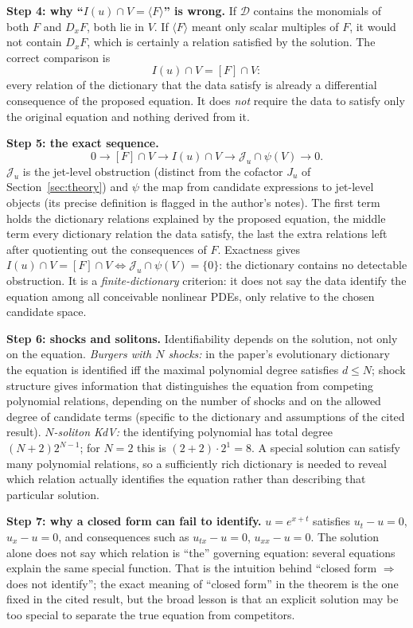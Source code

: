 \medskip\textbf{Step 4: why ``$I(u)\cap V=\langle F\rangle$'' is wrong.} If $\mathcal D$ contains the monomials of both $F$ and $D_xF$, both lie in $V$. If $\langle F\rangle$ meant only scalar multiples of $F$, it would not contain $D_xF$, which is certainly a relation satisfied by the solution. The correct comparison is
\[
I(u)\cap V=[F]\cap V:
\]
every relation of the dictionary that the data satisfy is already a differential consequence of the proposed equation. It does \emph{not} require the data to satisfy only the original equation and nothing derived from it.

\medskip\textbf{Step 5: the exact sequence.}
\[
0\to[F]\cap V\to I(u)\cap V\to\mathcal J_u\cap\psi(V)\to0 .
\]
$\mathcal J_u$ is the jet-level obstruction (distinct from the cofactor $J_u$ of Section~\ref{sec:theory}) and $\psi$ the map from candidate expressions to jet-level objects (its precise definition is flagged in the author's notes). The first term holds the dictionary relations explained by the proposed equation, the middle term every dictionary relation the data satisfy, the last the extra relations left after quotienting out the consequences of $F$. Exactness gives $I(u)\cap V=[F]\cap V\iff\mathcal J_u\cap\psi(V)=\{0\}$: the dictionary contains no detectable obstruction. It is a \emph{finite-dictionary} criterion: it does not say the data identify the equation among all conceivable nonlinear PDEs, only relative to the chosen candidate space.

\medskip\textbf{Step 6: shocks and solitons.} Identifiability depends on the solution, not only on the equation. \emph{Burgers with $N$ shocks:} in the paper's evolutionary dictionary the equation is identified iff the maximal polynomial degree satisfies $d\le N$; shock structure gives information that distinguishes the equation from competing polynomial relations, depending on the number of shocks and on the allowed degree of candidate terms (specific to the dictionary and assumptions of the cited result). \emph{$N$-soliton KdV:} the identifying polynomial has total degree $(N+2)2^{N-1}$; for $N=2$ this is $(2+2)\cdot2^{1}=8$. A special solution can satisfy many polynomial relations, so a sufficiently rich dictionary is needed to reveal which relation actually identifies the equation rather than describing that particular solution.

\medskip\textbf{Step 7: why a closed form can fail to identify.} $u=e^{x+t}$ satisfies $u_t-u=0$, $u_x-u=0$, and consequences such as $u_{tx}-u=0$, $u_{xx}-u=0$. The solution alone does not say which relation is ``the'' governing equation: several equations explain the same special function. That is the intuition behind ``closed form $\Rightarrow$ does not identify''; the exact meaning of ``closed form'' in the theorem is the one fixed in the cited result, but the broad lesson is that an explicit solution may be too special to separate the true equation from competitors.

